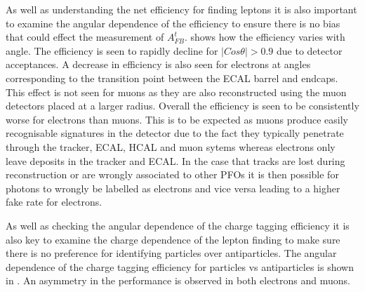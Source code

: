 As well as understanding the net efficiency for finding leptons it is also important to examine the angular dependence of the efficiency to ensure there is no bias that could effect the measurement of $A_{FB}^{t}$.  shows how the efficiency varies with angle. The efficiency is seen to rapidly decline for $|Cos\theta| > 0.9$ due to detector acceptances. A decrease in efficiency is also seen for electrons at angles corresponding to the transition point between the ECAL barrel and endcaps. This effect is not seen for muons as they are also reconstructed using the muon detectors placed at a larger radius. Overall the efficiency is seen to be consistently worse for electrons than muons. This is to be expected as muons produce easily recognisable signatures in the detector due to the fact they typically penetrate through the tracker, ECAL, HCAL and muon sytems whereas electrons only leave deposits in the tracker and ECAL. In the case that tracks are lost during reconstruction or are wrongly associated to other PFOs it is then possible for photons to wrongly be labelled as electrons and vice versa leading to a higher fake rate for electrons.

As well as checking the angular dependence of the charge tagging efficiency it is also key to examine the charge dependence of the lepton finding to make sure there is no preference for identifying particles over antiparticles. The angular dependence of the charge tagging efficiency for particles vs antiparticles is shown in . An asymmetry in the performance is observed in both electrons and muons.

